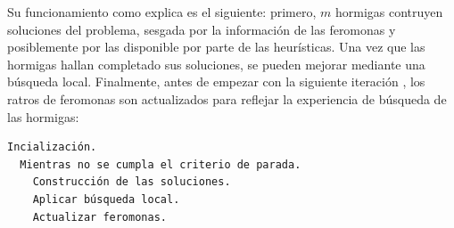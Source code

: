 Su funcionamiento como explica \cite{GePo2010} es el siguiente: primero, $m$ hormigas contruyen
soluciones del problema, sesgada por la informaci\'on de las feromonas y posiblemente
por las disponible por parte de las heur\'isticas. Una vez que las hormigas hallan completado
sus soluciones, se pueden mejorar mediante una b\'usqueda local. Finalmente,
antes de empezar con la siguiente iteraci\'on , los ratros de feromonas son
actualizados para reflejar la experiencia de b\'usqueda de las hormigas:

\begin{lstlisting}[mathescape, language=Pascal]
  Incialización.
  Mientras no se cumpla el criterio de parada.
    Construcción de las soluciones.
    Aplicar búsqueda local.
    Actualizar feromonas.
\end{lstlisting}

